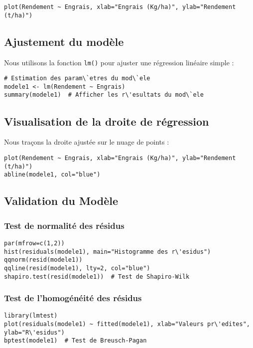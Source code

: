 \documentclass{article}
\begin{document}
\begin{verbatim}
plot(Rendement ~ Engrais, xlab="Engrais (Kg/ha)", ylab="Rendement (t/ha)")
\end{verbatim}

\subsection{Ajustement du mod\`ele}
Nous utilisons la fonction \texttt{lm()} pour ajuster une r\'egression lin\'eaire simple :

\begin{verbatim}
# Estimation des param\`etres du mod\`ele
modele1 <- lm(Rendement ~ Engrais)
summary(modele1)  # Afficher les r\'esultats du mod\`ele
\end{verbatim}

\subsection{Visualisation de la droite de r\'egression}
Nous tra\c cons la droite ajust\'ee sur le nuage de points :

\begin{verbatim}
plot(Rendement ~ Engrais, xlab="Engrais (Kg/ha)", ylab="Rendement (t/ha)")
abline(modele1, col="blue")
\end{verbatim}

\subsection{Validation du Mod\`ele}
\subsubsection{Test de normalit\'e des r\'esidus}
\begin{verbatim}
par(mfrow=c(1,2))
hist(residuals(modele1), main="Histogramme des r\'esidus")
qqnorm(resid(modele1))
qqline(resid(modele1), lty=2, col="blue")
shapiro.test(resid(modele1))  # Test de Shapiro-Wilk
\end{verbatim}

\subsubsection{Test de l'homog\'en\'eit\'e des r\'esidus}
\begin{verbatim}
library(lmtest)
plot(residuals(modele1) ~ fitted(modele1), xlab="Valeurs pr\'edites", ylab="R\'esidus")
bptest(modele1)  # Test de Breusch-Pagan
\end{verbatim}
\end{document}
